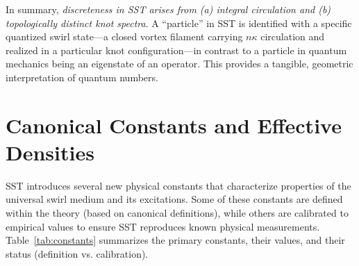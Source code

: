 \documentclass[reprint,aps,onecolumn,nofootinbib]{revtex4-2}
\begin{document}
	In summary, \emph{discreteness in SST arises from (a) integral circulation and (b) topologically distinct knot spectra}. A “particle” in SST is identified with a specific quantized swirl state—a closed vortex filament carrying $n\kappa$ circulation and realized in a particular knot configuration—in contrast to a particle in quantum mechanics being an eigenstate of an operator. This provides a tangible, geometric interpretation of quantum numbers.



	\section{Canonical Constants and Effective Densities}
	SST introduces several new physical constants that characterize properties of the universal swirl medium and its excitations. Some of these constants are defined within the theory (based on canonical definitions), while others are calibrated to empirical values to ensure SST reproduces known physical measurements. Table~\ref{tab:constants} summarizes the primary constants, their values, and their status (definition vs. calibration).
\end{document}
